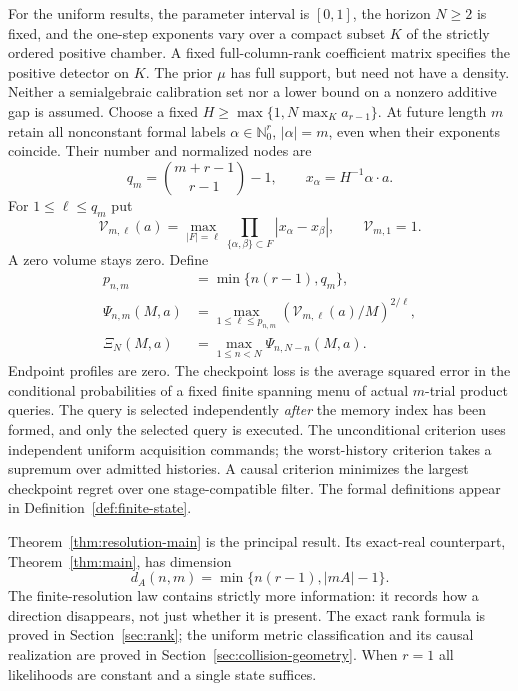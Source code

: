 For the uniform results, the parameter interval is $[0,1]$, the horizon
$N\ge2$ is fixed, and the one-step exponents vary over a compact subset
$K$ of the strictly ordered positive chamber. A fixed full-column-rank
coefficient matrix specifies the positive detector on $K$. The prior
$\mu$ has full support, but need not have a density. Neither a
semialgebraic calibration set nor a lower bound on a nonzero additive
gap is assumed. Choose a fixed
$H\ge\max\{1,N\max_K a_{r-1}\}$. At future length $m$ retain all
nonconstant formal labels $\alpha\in\mathbb N_0^r$, $|\alpha|=m$,
even when their exponents coincide. Their number and normalized nodes are
\[
 q_m=\binom{m+r-1}{r-1}-1,\qquad x_\alpha=H^{-1}\alpha\cdot a.
\]
For $1\le\ell\le q_m$ put
\[
 \mathcal V_{m,\ell}(a)=\max_{|F|=\ell}
       \prod_{\{\alpha,\beta\}\subset F}|x_\alpha-x_\beta|,
 \qquad \mathcal V_{m,1}=1.
\]
A zero volume stays zero. Define
\[
 \begin{split}
 p_{n,m}&=\min\{n(r-1),q_m\},\\
 \Psi_{n,m}(M,a)&=\max_{1\le\ell\le p_{n,m}}
              (\mathcal V_{m,\ell}(a)/M)^{2/\ell},\\
 \Xi_N(M,a)&=\max_{1\le n<N}\Psi_{n,N-n}(M,a).
 \end{split}
\]
Endpoint profiles are zero. The checkpoint loss is the average squared
error in the conditional probabilities of a fixed finite spanning menu
of actual $m$-trial product queries. The query is selected independently
\emph{after} the memory index has been formed, and only the selected
query is executed. The unconditional criterion uses independent uniform
acquisition commands; the worst-history criterion takes a supremum over
admitted histories. A causal criterion minimizes the largest checkpoint
regret over one stage-compatible filter. The formal definitions appear
in Definition~\ref{def:finite-state}.



Theorem~\ref{thm:resolution-main} is the principal result. Its exact-real
counterpart, Theorem~\ref{thm:main}, has dimension
\[
 d_A(n,m)=\min\{n(r-1),|mA|-1\}.
\]
The finite-resolution law contains strictly more information: it records
how a direction disappears, not just whether it is present. The exact
rank formula is proved in Section~\ref{sec:rank}; the uniform metric
classification and its causal realization are proved in
Section~\ref{sec:collision-geometry}. When $r=1$ all likelihoods are
constant and a single state suffices.

